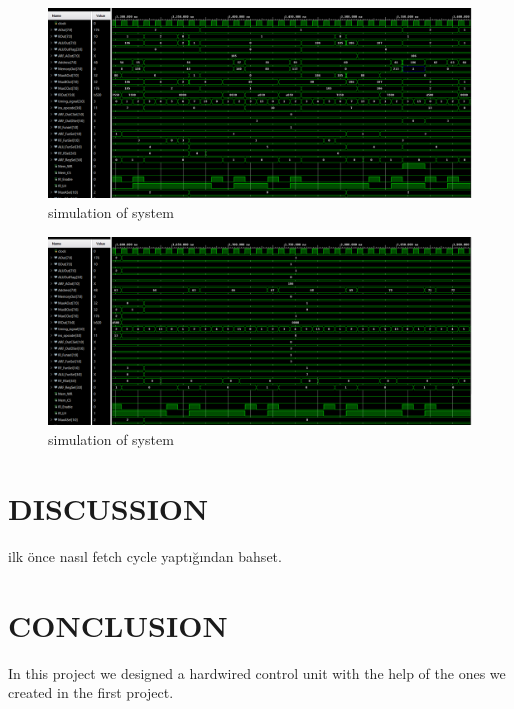 \documentclass[pdftex,12pt,a4paper]{article}
\begin{document}
\begin{figure}[H]
    \centering
    \includegraphics[width=1\textwidth]{photos/system_result_12.png}	
    \caption{simulation of system}
    \label{implementation}
\end{figure}

\begin{figure}[H]
    \centering
    \includegraphics[width=1\textwidth]{photos/system_result_13.png}	
    \caption{simulation of system}
    \label{implementation}
\end{figure}




\section{DISCUSSION}

ilk önce nasıl fetch cycle yaptığından bahset. 




\section{CONCLUSION}
In this project we designed a hardwired control unit with the help of the ones we created in the first project. 
\end{document}
